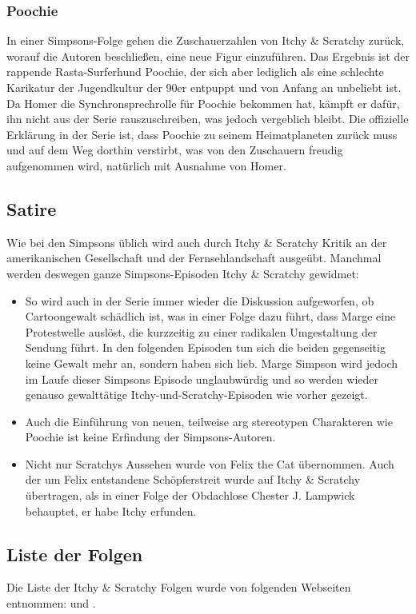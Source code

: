 \begin{appendix}
\subsubsection{Poochie}
In einer Simpsons-Folge gehen die Zuschauerzahlen von Itchy \& Scratchy zurück, worauf die Autoren beschließen, eine neue Figur einzuführen. Das Ergebnis ist der rappende Rasta-Surferhund Poochie, der sich aber lediglich als eine schlechte Karikatur der Jugendkultur der 90er entpuppt und von Anfang an unbeliebt ist. Da Homer die Synchronsprechrolle für Poochie bekommen hat, kämpft er dafür, ihn nicht aus der Serie rauszuschreiben, was jedoch vergeblich bleibt. Die offizielle Erklärung in der Serie ist, dass Poochie zu seinem Heimatplaneten zurück muss und auf dem Weg dorthin verstirbt, was von den Zuschauern freudig aufgenommen wird, natürlich mit Ausnahme von Homer.

\subsection{Satire}
Wie bei den Simpsons üblich wird auch durch Itchy \& Scratchy Kritik an der amerikanischen Gesellschaft und der Fernsehlandschaft ausgeübt. Manchmal werden deswegen ganze Simpsons-Episoden Itchy \& Scratchy gewidmet:
\begin{itemize}
	\item So wird auch in der Serie immer wieder die Diskussion aufgeworfen, ob Cartoongewalt schädlich ist, was in einer Folge dazu führt, dass Marge eine Protestwelle auslöst, die kurzzeitig zu einer radikalen Umgestaltung der Sendung führt. In den folgenden Episoden tun sich die beiden gegenseitig keine Gewalt mehr an, sondern haben sich lieb. Marge Simpson wird jedoch im Laufe dieser Simpsons Episode unglaubwürdig und so werden wieder genauso gewalttätige Itchy-und-Scratchy-Episoden wie vorher gezeigt.
	\item Auch die Einführung von neuen, teilweise arg stereotypen Charakteren wie Poochie ist keine Erfindung der Simpsons-Autoren.
	\item Nicht nur Scratchys Aussehen wurde von Felix the Cat übernommen. Auch der um Felix entstandene Schöpferstreit wurde auf Itchy \& Scratchy übertragen, als in einer Folge der Obdachlose Chester J. Lampwick behauptet, er habe Itchy erfunden. 
\end{itemize}



\subsection{Liste der Folgen}\label{ItchyAndScratchy}
Die Liste der Itchy \& Scratchy Folgen wurde von folgenden Webseiten entnommen: \cite{Simpsons001} und \cite{itchy}.


\end{appendix}
